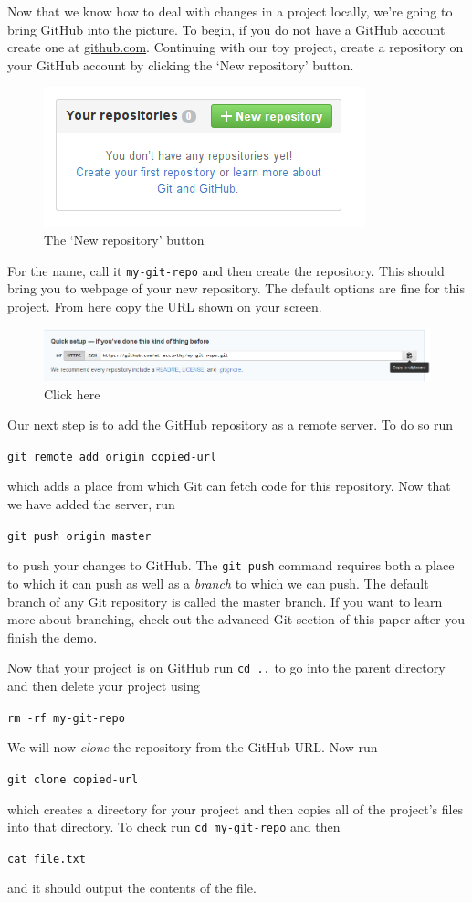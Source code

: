 \documentclass[notitlepage]{simple}
\begin{document}
Now that we know how to deal with changes in a project locally, we're going to bring GitHub into the picture.
To begin, if you do not have a GitHub account create one at \url{github.com}.
Continuing with our toy project, create a repository on your GitHub account by clicking the `New repository' button.
\begin{figure}[H]
	\centering
	\includegraphics[scale=0.5]{new-repo.png}
	\caption{The `New repository' button}
\end{figure}
For the name, call it \verb|my-git-repo| and then create the repository.
This should bring you to webpage of your new repository.
The default options are fine for this project.
From here copy the URL shown on your screen.
\begin{figure}[H]
	\centering
	\includegraphics[scale=0.4]{copy-repo.png}
	\caption{Click here}
\end{figure}
Our next step is to add the GitHub repository as a remote server.
To do so run
\begin{terminal}
	\verb|git remote add origin copied-url|
\end{terminal}
which adds a place from which Git can fetch code for this repository.
Now that we have added the server, run
\begin{terminal}
	\verb|git push origin master|
\end{terminal}
to push your changes to GitHub.
The \verb|git push| command requires both a place to which it can push as well as a \textit{branch} to which we can push.
The default branch of any Git repository is called the master branch.
If you want to learn more about branching, check out the advanced Git section of this paper after you finish the demo.

Now that your project is on GitHub run \verb|cd ..| to go into the parent directory and then delete your project using
\begin{terminal}
	\verb|rm -rf my-git-repo|
\end{terminal}
We will now \textit{clone} the repository from the GitHub URL.
Now run
\begin{terminal}
	\verb|git clone copied-url|
\end{terminal}
which creates a directory for your project and then copies all of the project's files into that directory.
To check run \verb|cd my-git-repo| and then
\begin{terminal}
	\verb|cat file.txt|
\end{terminal}
and it should output the contents of the file.
\end{document}
